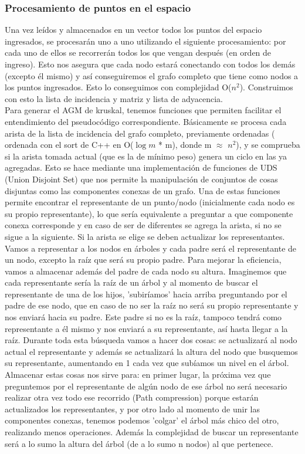 \documentclass[11pt,a4paper]{article}
\begin{document}
\subsubsection{Procesamiento de puntos en el espacio}
Una vez leídos y almacenados en un vector todos los puntos del espacio ingresados, se procesarán uno a uno utilizando el siguiente procesamiento: por cada uno de ellos se recorrerán todos los que vengan después (en orden de ingreso). Esto nos asegura que cada nodo estará conectando con todos los demás (excepto él mismo) y así conseguiremos el grafo completo que tiene como nodos a los puntos ingresados. Esto lo conseguimos con complejidad O($n^{2}$). Construimos con esto la lista de incidencia y matriz y lista de adyacencia.\\
Para generar el AGM de kruskal, tenemos funciones que permiten facilitar el entendimiento del pseudocódigo correspondiente. Básicamente se procesa cada arista de la lista de incidencia del grafo completo, previamente ordenadas ( ordenada con el sort de C++ en O($\log{m}$ * m), donde m $\approx$ $n^2$), y se comprueba si la arista tomada actual (que es la de mínimo peso) genera un ciclo en las ya agregadas. Esto se hace mediante una implementación de funciones de UDS (Union Disjoint Set) que nos permite la manipulación de conjuntos de cosas disjuntas como las componentes conexas de un grafo. Una de estas funciones permite encontrar el representante de un punto/nodo (inicialmente cada nodo es su propio representante), lo que sería equivalente a preguntar a que componente conexa corresponde y en caso de ser de diferentes se agrega la arista, si no se sigue a la siguiente. Si la arista se elige se deben actualizar los representantes. Vamos a representar a los nodos en árboles y cada padre será el representante de un nodo, excepto la raíz que será su propio padre. Para mejorar la eficiencia, vamos a almacenar además del padre de cada nodo su altura. Imaginemos que cada representante sería la raíz de un árbol y al momento de buscar el representante de una de los hijos, 'subiríamos' hacia arriba preguntando por el padre de ese nodo, que en caso de no ser la raíz no será su propio representante y nos enviará hacia su padre. Este padre si no es la raíz, tampoco tendrá como representante a él mismo y nos enviará a su representante, así hasta llegar a la raíz. Durante toda esta búsqueda vamos a hacer dos cosas: se actualizará al nodo actual el representante y además se actualizará la altura del nodo que busquemos su representante, aumentando en 1 cada vez que subíamos un nivel en el árbol. Almacenar estas cosas nos sirve para: en primer lugar, la próxima vez que preguntemos por el representante de algún nodo de ese árbol no será necesario realizar otra vez todo ese recorrido (Path compression) porque estarán actualizados los representantes, y por otro lado al momento de unir las componentes conexas, tenemos podemos 'colgar' el árbol más chico del otro, realizando menos operaciones. Además la complejidad de buscar un representante será a lo sumo la altura del árbol (de a lo sumo n nodos) al que pertenece.\\
\end{document}
